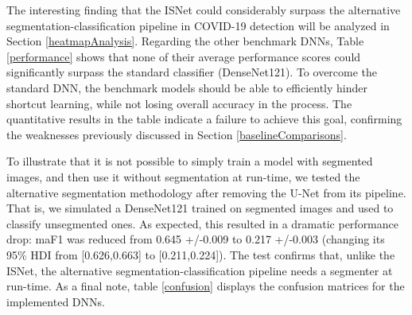 \documentclass[fleqn,10pt]{wlscirep}
\begin{document}
{The interesting finding that the ISNet could considerably surpass the alternative segmentation-classification pipeline in COVID-19 detection will be analyzed in Section \ref{heatmapAnalysis}. Regarding the other benchmark DNNs, Table \ref{performance} shows that none of their average performance scores could significantly surpass the standard classifier (DenseNet121). To overcome the standard DNN, the benchmark models should be able to efficiently hinder shortcut learning, while not losing overall accuracy in the process. The quantitative results in the table indicate a failure to achieve this goal, confirming the weaknesses previously discussed in Section \ref{baselineComparisons}.

To illustrate that it is not possible to simply train a model with segmented images, and then use it without segmentation at run-time, we tested the alternative segmentation methodology after removing the U-Net from its pipeline. That is, we simulated a DenseNet121 trained on segmented images and used to classify unsegmented ones. As expected, this resulted in a dramatic performance drop: maF1 was reduced from 0.645 +/-0.009 to 0.217 +/-0.003 (changing its 95\% HDI from [0.626,0.663] to [0.211,0.224]). The test confirms that, unlike the ISNet, the alternative segmentation-classification pipeline needs a segmenter at run-time. As a final note, table \ref{confusion} displays the confusion matrices for the implemented DNNs. 

}
\end{document}

